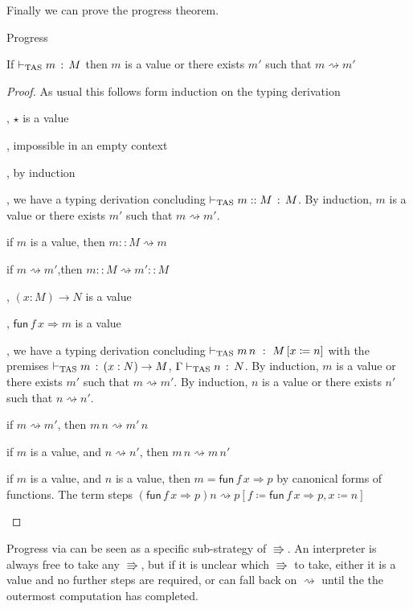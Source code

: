 
Finally we can prove the progress theorem.
\begin{thm}
Progress
 
If $\vdash_{\mathrm{TAS}} m\,:\,M$ then $m$ is a value or there exists $m'$ such that $m\rightsquigarrow m'$
\end{thm}
 
\begin{proof}
As usual this follows form induction on the typing derivation
 
\begin{casenv}
 \item {}, $\star$ is a value
 \item {}, impossible in an empty context
 \item {}, by induction
 \item {}, we have a typing derivation concluding $\vdash_{\mathrm{TAS}} m::M\,:\,M$.
 By induction, $m$ is a value or there exists $m'$ such that $m\rightsquigarrow m'$.
 \begin{casenv}
   \item if $m$ is a value, then $m::M\rightsquigarrow m$
   \item if $m\rightsquigarrow m'$,then $m::M\rightsquigarrow m'::M$
 \end{casenv}
 \item {}, $\left(x:M\right)\rightarrow N$ is a value
 \item {}, $\mathsf{fun}\,f\,x\Rightarrow m$ is a value
 \item {}, we have a typing derivation concluding $\vdash_{\mathrm{TAS}} m\,n\ :\ M\left[x\coloneqq n\right]$ with the premises $\vdash_{\mathrm{TAS}} m\,:\,\left(x:N\right)\rightarrow M$, $\Gamma\vdash_{\mathrm{TAS}} n\,:\,N$.
 By induction, $m$ is a value or there exists $m'$ such that $m\rightsquigarrow m'$.
 By induction, $n$ is a value or there exists $n'$ such that $n\rightsquigarrow n'$.
 \begin{casenv}
   \item if $m\rightsquigarrow m'$, then $m\,n\rightsquigarrow m'\,n$
   \item if $m$ is a value, and $n\rightsquigarrow n'$,  then $m\,n\rightsquigarrow m\,n'$
   \item if $m$ is a value, and $n$ is a value, then $m=\mathsf{fun}\,f\,x\Rightarrow p$ by canonical forms of functions.
     The term steps $\left(\mathsf{fun}\,f\,x\Rightarrow p\right)n\rightsquigarrow p\left[f\coloneqq\mathsf{fun}\,f\,x\Rightarrow p,x\coloneqq n\right]$
 \end{casenv}
\end{casenv}
 
\end{proof}
Progress via \cbv{} can be seen as a specific sub-strategy of $\Rrightarrow$.
An interpreter is always free to take any $\Rrightarrow$, but if it is unclear which $\Rrightarrow$ to take, either it is a value and no further steps are required, or can fall back on $\rightsquigarrow$ until the the outermost computation has completed.
 
